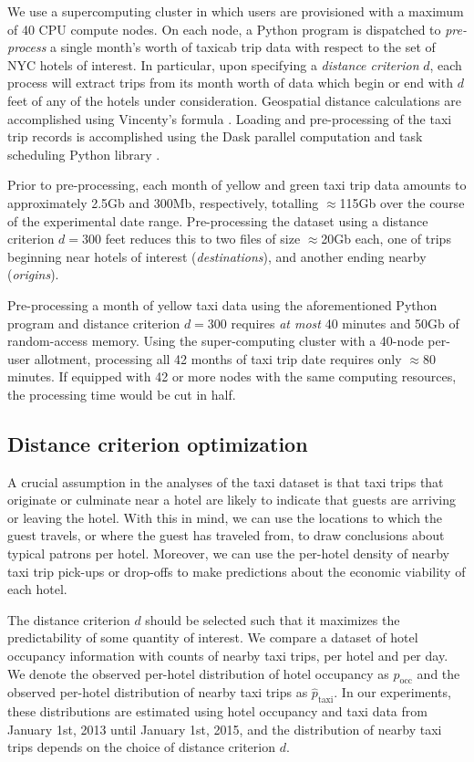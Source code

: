\documentclass[useAMS, referee, usenatbib]{biom}
\begin{document}
We use a supercomputing cluster in which users are provisioned with a maximum of 40 CPU compute nodes. On each node, a Python program is dispatched to \textit{pre-process} a single month's worth of taxicab trip data with respect to the set of NYC hotels of interest. In particular, upon specifying a \textit{distance criterion} $d$, each process will extract trips from its month worth of data which begin or end with $d$ feet of any of the hotels under consideration. Geospatial distance calculations are accomplished using Vincenty's formula \citep{bessel_calculation_2010}. Loading and pre-processing of the taxi trip records is accomplished using the Dask parallel computation and task scheduling Python library \cite{dask}.

Prior to pre-processing, each month of yellow and green taxi trip data amounts to approximately 2.5Gb and 300Mb, respectively, totalling $\approx$115Gb over the course of the experimental date range. Pre-processing the dataset using a distance criterion $d = 300$ feet reduces this to two files of size $\approx$20Gb each, one of trips beginning near hotels of interest (\textit{destinations}), and another ending nearby (\textit{origins}).

Pre-processing a month of yellow taxi data using the aforementioned Python program and distance criterion $d = 300$ requires \textit{at most} 40 minutes and 50Gb of random-access memory. Using the super-computing cluster with a 40-node per-user allotment, processing all 42 months of taxi trip date requires only $\approx$80 minutes. If equipped with 42 or more nodes with the same computing resources, the processing time would be cut in half.

\subsection{Distance criterion optimization}

A crucial assumption in the analyses of the taxi dataset is that taxi trips that originate or culminate near a hotel are likely to indicate that guests are arriving or leaving the hotel. With this in mind, we can use the locations to which the guest travels, or where the guest has traveled from, to draw conclusions about typical patrons per hotel. Moreover, we can use the per-hotel density of nearby taxi trip pick-ups or drop-offs to make predictions about the economic viability of each hotel.

The distance criterion $d$ should be selected such that it maximizes the predictability of some quantity of interest. We compare a dataset of hotel occupancy information with counts of nearby taxi trips, per hotel and per day. We denote the observed per-hotel distribution of hotel occupancy as $\hat{p}_{\mathrm{occ}}$ and the observed per-hotel distribution of nearby taxi trips as $\hat{p}_{\mathrm{taxi}}$. In our experiments, these distributions are estimated using hotel occupancy and taxi data from January 1st, 2013 until January 1st, 2015, and the distribution of nearby taxi trips depends on the choice of distance criterion $d$.
\end{document}
